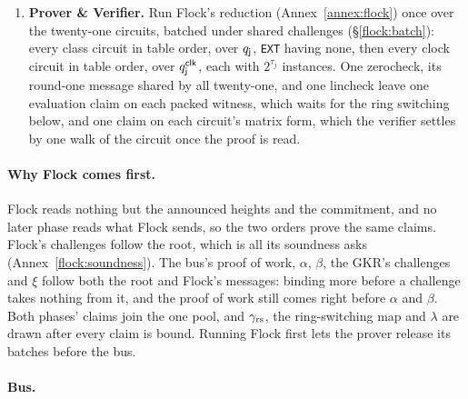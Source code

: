 \begin{enumerate}
\item \textbf{Prover \& Verifier.} Run Flock's reduction (Annex~\ref{annex:flock}) once over the twenty-one circuits, batched under shared challenges (\S\ref{flock:batch}): every class circuit in table order, over $q_{\mathsf{j}}$, \texttt{EXT} having none, then every clock circuit in table order, over $q^{\mathsf{clk}}_{\mathsf{j}}$, each with $2^{\tau_j}$ instances. One zerocheck, its round-one message shared by all twenty-one, and one lincheck leave one evaluation claim on each packed witness, which waits for the ring switching below, and one claim on each circuit's matrix form, which the verifier settles by one walk of the circuit once the proof is read.
\end{enumerate}

\paragraph{Why Flock comes first.} Flock reads nothing but the announced heights and the commitment, and no later phase reads what Flock sends, so the two orders prove the same claims. Flock's challenges follow the root, which is all its soundness asks (Annex~\ref{flock:soundness}). The bus's proof of work, $\alpha$, $\beta$, the GKR's challenges and $\xi$ follow both the root and Flock's messages: binding more before a challenge takes nothing from it, and the proof of work still comes right before $\alpha$ and $\beta$. Both phases' claims join the one pool, and $\gamma_{\mathrm{rs}}$, the ring-switching map and $\lambda$ are drawn after every claim is bound. Running Flock first lets the prover release its batches before the bus.

\paragraph{Bus.}

